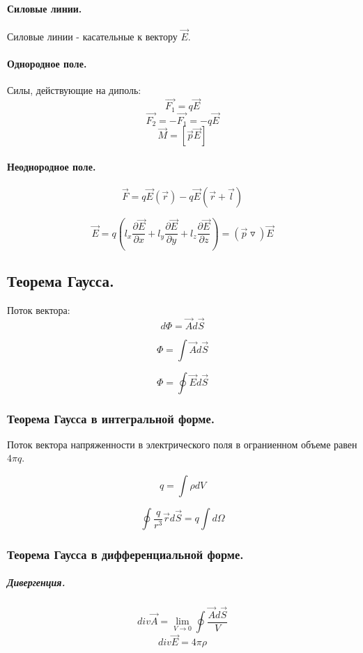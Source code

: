 \documentclass{article}
\begin{document}
    \paragraph{Силовые линии.} Силовые линии - касательные к вектору $\overrightarrow{E}$.
  
    \paragraph{Однородное поле.} Силы, действующие на диполь: 
    $$ \overrightarrow{F_1} = q\overrightarrow{E} $$
    $$ \overrightarrow{F_2} = -\overrightarrow{F_1} = -q\overrightarrow{E} $$
    $$ \overrightarrow{M} = [\overrightarrow{p}\overrightarrow{E}] $$
  
    \paragraph{Неоднородное поле.}
    $$ \overrightarrow{F} = q\overrightarrow{E}(\overrightarrow{r}) - q\overrightarrow{E}(\overrightarrow{r} + \overrightarrow{l}) $$
  
    $$ \overrightarrow{E}= q \left(l_x \frac{\partial\overrightarrow{E}}{\partial x} + l_y \frac{\partial\overrightarrow{E}}{\partial y} + l_z \frac{\partial\overrightarrow{E}}{\partial z} \right)  = \left(\overrightarrow{p}\triangledown\right)\overrightarrow{E} $$ 

    \subsection*{Теорема Гаусса.}
    Поток вектора:
    $$ d\Phi = \overrightarrow{A} d\overrightarrow{S} $$
  
    $$ \Phi = \int \overrightarrow{A}d\overrightarrow{S} $$
  
    $$ \Phi = \oint \overrightarrow{E}d\overrightarrow{S} $$
  
    \subsubsection*{Теорема Гаусса в интегральной форме.} Поток вектора напряженности в электрического поля в ограниенном объеме равен $ 4\pi q $.
  
    $$ q = \int \rho dV $$
  
    $$ \oint \frac{q}{r^3} \overrightarrow{r} d\overrightarrow{S} = q\int d\Omega $$
  
    \subsubsection*{Теорема Гаусса в дифференциальной форме.}

    \subparagraph{Дивергенция.}
    $$ div \overrightarrow{A} = \lim \limits_{V \rightarrow 0} \oint \frac{\overrightarrow{A}d\overrightarrow{S}}{V} $$
    $$ \boxed{div \overrightarrow{E} = 4\pi \rho} $$
  
\end{document}
